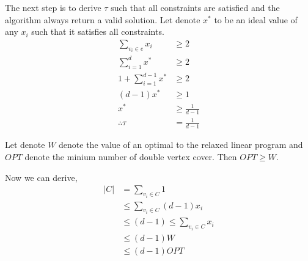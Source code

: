 The next step is to derive $\tau$ such that all constraints are satisfied and the algorithm always return a valid solution. Let denote
$x^*$ to be an ideal value of any $x_i$ such that it satisfies all constraints.
\begin{align*}
\sum\limits_{v_{i} \in e} x_i &\geq 2 \\
\sum\limits_{i=1}^d x^* &\geq 2 \\
1 + \sum\limits_{i=1}^{d-1} x^* &\geq 2 \\
(d-1) x^* &\geq 1 \\
x^* &\geq \frac{1}{d-1} \\
\therefore \tau &= \frac{1}{d-1}
\end{align*}

Let denote $W$ denote the value of an optimal to the relaxed linear program and $OPT$ denote the minium number of double vertex cover.
Then $OPT \geq W$.

Now we can derive,
\begin{align*}
    |C| &= \sum\limits_{v_i \in C} 1 \\
        &\leq \sum\limits_{v_i \in C} (d-1)x_i \\
        &\leq (d-1)\leq \sum\limits_{v_i \in C} x_i \\
        &\leq (d-1)W \\
        &\leq (d-1)OPT \\
\end{align*}
